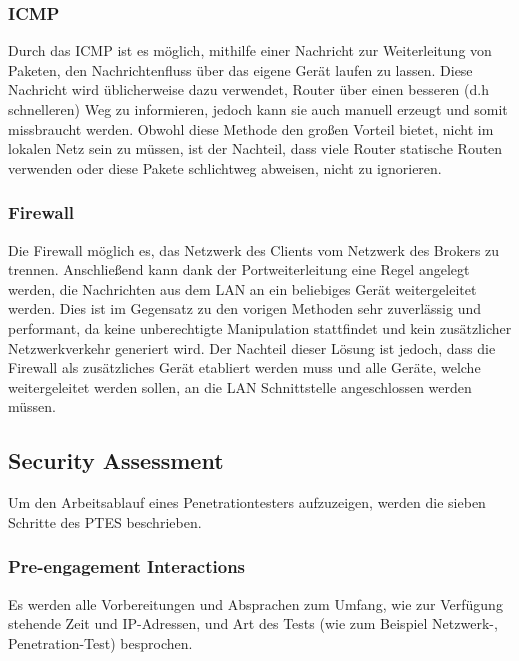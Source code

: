         \subsubsection{ICMP}
        Durch das \ac{ICMP} ist es möglich, mithilfe einer Nachricht zur Weiterleitung von Paketen, den Nachrichtenfluss über das eigene Gerät laufen zu lassen.
        Diese Nachricht wird üblicherweise dazu verwendet, Router über einen besseren (d.h schnelleren) Weg zu informieren, jedoch kann sie auch manuell erzeugt und somit missbraucht werden. Obwohl diese Methode den großen Vorteil bietet, nicht im lokalen Netz sein zu müssen, ist der Nachteil, dass viele Router statische Routen verwenden oder diese Pakete schlichtweg abweisen, nicht zu ignorieren.
        \subsubsection{Firewall}
        Die Firewall möglich es, das Netzwerk des Clients vom Netzwerk des Brokers zu trennen. Anschließend kann dank der Portweiterleitung eine Regel angelegt werden, die Nachrichten aus dem \ac{LAN} an ein beliebiges Gerät weitergeleitet werden. Dies ist im Gegensatz zu den vorigen Methoden sehr zuverlässig und performant, da keine unberechtigte Manipulation stattfindet und kein zusätzlicher Netzwerkverkehr generiert wird. Der Nachteil dieser Lösung ist jedoch, dass die Firewall als zusätzliches Gerät etabliert werden muss und alle Geräte, welche weitergeleitet werden sollen, an die \ac{LAN} Schnittstelle angeschlossen werden müssen.
        
    \subsection{Security Assessment}
        Um den Arbeitsablauf eines Penetrationtesters aufzuzeigen, werden die sieben Schritte des \ac{PTES} \cite{hsiangchih_2019} beschrieben.
    
    \subsubsection{\glqq Pre-engagement Interactions\grqq{}}
        Es werden alle Vorbereitungen und Absprachen zum Umfang, wie zur Verfügung stehende Zeit und \acs{IP}-Adressen, und Art des Tests (wie zum Beispiel Netzwerk-, Penetration-Test) besprochen.
